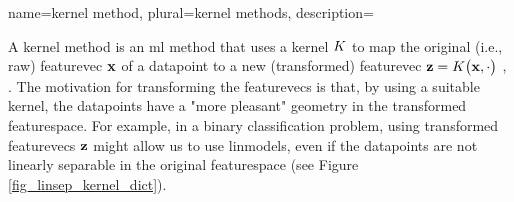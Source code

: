 {name={kernel method}, 
	plural={kernel methods}, 
	description={A \gls{kernel} method is an \gls{ml} method that uses a 
	\gls{kernel} $K$ to map the original (i.e., raw) \gls{featurevec} ${\bf x}$ of a 
	\gls{datapoint} to a new (transformed) \gls{featurevec} ${\bf z} = K\big({\bf x},\cdot\big)$ \cite{LearningKernelsBook}, \cite{LampertNowKernel}.
	The motivation for transforming the \glspl{featurevec} is that, by using a suitable \gls{kernel}, 
	the \glspl{datapoint} have a "more pleasant" geometry in the transformed \gls{featurespace}. 
	For example, in a binary \gls{classification} problem, using transformed \glspl{featurevec} ${\bf z}$ might 
	allow us to use \glspl{linmodel}, even if the \glspl{datapoint} are not linearly 
	separable in the original \gls{featurespace} (see Figure \ref{fig_linsep_kernel_dict}). 
	\begin{figure}[H]
\begin{center}
\end{center}
\end{figure}}}
